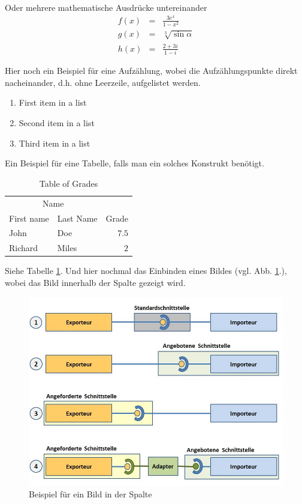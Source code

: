 \documentclass[fleqn,10pt,ngerman]{SelfArx}
\begin{document}
Oder mehrere mathematische Ausdrücke untereinander
\begin{eqnarray}
	f(x) &=& \frac{3 e^x}{1 - x^2} \\
	g(x) &=& \sqrt[3]{\sin \alpha} \\
	h(x) &=& \frac{2 + 3i}{1- i}
\end{eqnarray}

Hier noch ein Beispiel für eine Aufzählung, wobei die Aufzählungspunkte direkt nacheinander, d.h. ohne Leerzeile, aufgelistet werden.
\begin{enumerate}[noitemsep] %
	\item First item in a list
	\item Second item in a list
	\item Third item in a list
\end{enumerate}

Ein Beispiel für eine Tabelle, falls man ein solches Konstrukt benötigt.

\begin{table}[hbt]
	\caption{Table of Grades}
	\centering
	\begin{tabular}{llr}
		\toprule
		\multicolumn{2}{c}{Name} \\
		\cmidrule(r){1-2}
		First name & Last Name & Grade \\
		\midrule
		John & Doe & $7.5$ \\
		Richard & Miles & $2$ \\
		\bottomrule
	\end{tabular}
	\label{tab:label}
\end{table}

Siehe Tabelle \ref{tab:label}.
Und hier nochmal das Einbinden eines Bildes (vgl. Abb. \ref{fig:Schnittstellen}.), wobei das Bild innerhalb der Spalte gezeigt wird.


\begin{figure}[ht]\centering
	\includegraphics[width=5 cm]{Abbildungen/Schnittstellen}
	\caption{Beispiel für ein Bild in der Spalte}
	\label{fig:Schnittstellen}
\end{figure}
\end{document}

